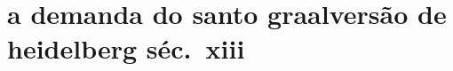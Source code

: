 \documentclass[11pt]{hedrabook}
\begin{document}
\hedratoc

\baselineskip=13.2pt   %


\part[a demanda do santo graal\\ versão de heidelberg séc.~xiii]{a demanda do santo graal\break versão de heidelberg séc.~xiii} 




\ifdefined\printcheck\printcheck\fi
\end{document}
